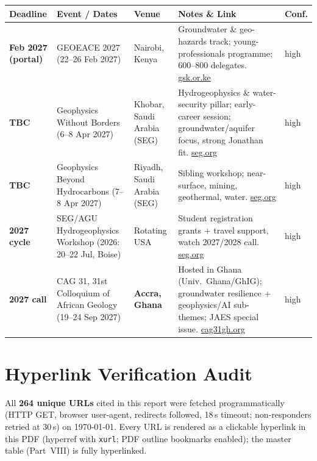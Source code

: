 \documentclass[11pt,a4paper]{article}
\begin{document}
\begin{longtable}{@{}p{3.2cm}p{3.0cm}p{2.5cm}p{5.2cm}p{1.6cm}@{}}
\toprule
\textbf{Deadline} & \textbf{Event / Dates} & \textbf{Venue} & \textbf{Notes \& Link} & \textbf{Conf.} \\
\midrule
\endhead
\textbf{Feb 2027 (portal)} & GEOEACE 2027 (22--26 Feb 2027) & Nairobi, Kenya & Groundwater \& geo-hazards track; young-professionals programme; 600--800 delegates. \href{https://gsk.or.ke/geoeace27/}{gsk.or.ke} & high \\
\midrule
\textbf{TBC} & Geophysics Without Borders (6--8 Apr 2027) & Khobar, Saudi Arabia (SEG) & Hydrogeophysics \& water-security pillar; early-career session; groundwater/aquifer focus, strong Jonathan fit. \href{https://seg.org/calendar_events/geophysics-without-borders-2027/}{seg.org} & high \\
\midrule
\textbf{TBC} & Geophysics Beyond Hydrocarbons (7--8 Apr 2027) & Riyadh, Saudi Arabia (SEG) & Sibling workshop; near-surface, mining, geothermal, water. \href{https://seg.org/calendar_events/geophysics-beyond-hydrocarbons-2027/}{seg.org} & high \\
\midrule
\textbf{2027 cycle} & SEG/AGU Hydrogeophysics Workshop (2026: 20--22 Jul, Boise) & Rotating USA & Student registration grants + travel support, watch 2027/2028 call. \href{https://seg.org/calendar_events/seg-agu-hydrogeophysics-workshop/}{seg.org} & high \\
\midrule
\textbf{2027 call} & CAG 31, 31st Colloquium of African Geology (19--24 Sep 2027) & \textbf{Accra, Ghana} & Hosted in Ghana (Univ.\ Ghana/GhIG); groundwater resilience + geophysics/AI sub-themes; JAES special issue. \href{https://www.cag31gh.org/}{cag31gh.org} & high \\
\bottomrule
\end{longtable}

\section{Hyperlink Verification Audit}

All \textbf{264 unique URLs} cited in this report were fetched programmatically (HTTP GET, browser user-agent, redirects followed, 18\,s timeout; non-responders retried at 30\,s) on \today. Every URL is rendered as a clickable hyperlink in this PDF (hyperref with \texttt{xurl}; PDF outline bookmarks enabled); the master table (Part~VIII) is fully hyperlinked.
\end{document}
